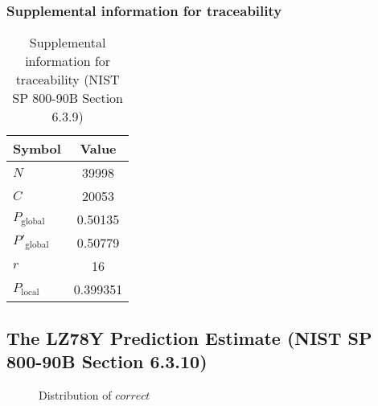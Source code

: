 \documentclass[a3paper,xelatex,english]{bxjsarticle}
\begin{document}
\subsubsection{Supplemental information for traceability}
\renewcommand{\arraystretch}{1.8}
\begin{table}[h]
\caption{Supplemental information for traceability (NIST SP 800-90B Section 6.3.9)}
\begin{center}
\begin{tabular}{|l|c|}
\hline 
\rowcolor{anotherlightblue} %
Symbol				& Value \\ \hline 
$N$				& 39998\\ \hline 
$C$				& 20053\\ \hline 
$P_{\textrm{global}}$				&  0.50135\\ \hline 
$P'_{\textrm{global}}$			&  0.50779\\ \hline 
$r$				& 16\\ \hline 
$P_{\textrm{local}}$ 			& 0.399351\\ \hline
\end{tabular}
\end{center}
\end{table}
\renewcommand{\arraystretch}{1.4}
\clearpage
\subsection{The LZ78Y Prediction Estimate (NIST SP 800-90B Section 6.3.10)}
\begin{figure}[htbp]
\caption{Distribution of $correct$}
\end{figure}
\end{document}

